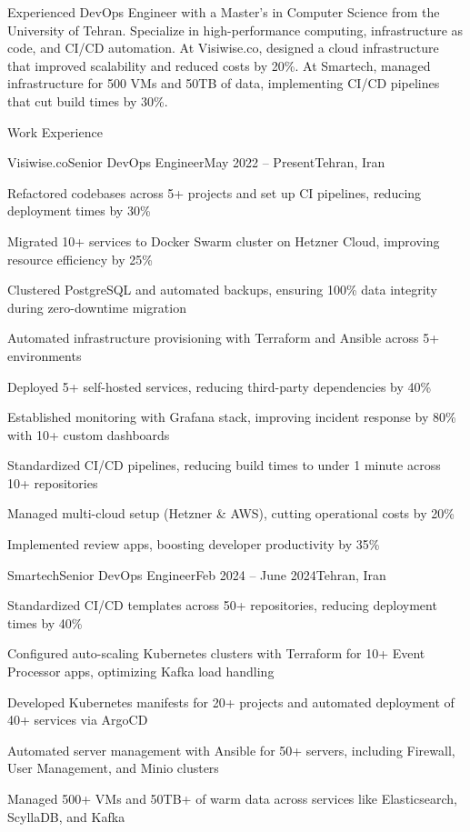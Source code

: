 \documentclass[]{main}
\begin{document}
\resumeheader
{}
{}
{}
{}
{}
{}

Experienced DevOps Engineer with a Master's in Computer Science from the University of Tehran. Specialize in high-performance computing, infrastructure as code, and CI/CD automation. At Visiwise.co, designed a cloud infrastructure that improved scalability and reduced costs by 20\%. At Smartech, managed infrastructure for 500 VMs and 50TB of data, implementing CI/CD pipelines that cut build times by 30\%.

\begin{section}{Work Experience}
 \begin{subsection}{Visiwise.co}{Senior DevOps Engineer}{May 2022 -- Present}{Tehran, Iran}
     \item Refactored codebases across 5+ projects and set up CI pipelines, reducing deployment times by 30\%
     \item Migrated 10+ services to Docker Swarm cluster on Hetzner Cloud, improving resource efficiency by 25\%
     \item Clustered PostgreSQL and automated backups, ensuring 100\% data integrity during zero-downtime migration
     \item Automated infrastructure provisioning with Terraform and Ansible across 5+ environments
     \item Deployed 5+ self-hosted services, reducing third-party dependencies by 40\%
     \item Established monitoring with Grafana stack, improving incident response by 80\% with 10+ custom dashboards
     \item Standardized CI/CD pipelines, reducing build times to under 1 minute across 10+ repositories
     \item Managed multi-cloud setup (Hetzner \& AWS), cutting operational costs by 20\%
     \item Implemented review apps, boosting developer productivity by 35\%
 \end{subsection}

 \begin{subsection}{Smartech}{Senior DevOps Engineer}{Feb 2024 -- June 2024}{Tehran, Iran}
     \item Standardized CI/CD templates across 50+ repositories, reducing deployment times by 40\%
     \item Configured auto-scaling Kubernetes clusters with Terraform for 10+ Event Processor apps, optimizing Kafka load handling
     \item Developed Kubernetes manifests for 20+ projects and automated deployment of 40+ services via ArgoCD
     \item Automated server management with Ansible for 50+ servers, including Firewall, User Management, and Minio clusters
     \item Managed 500+ VMs and 50TB+ of warm data across services like Elasticsearch, ScyllaDB, and Kafka
 \end{subsection}


\end{section}
\end{document}
